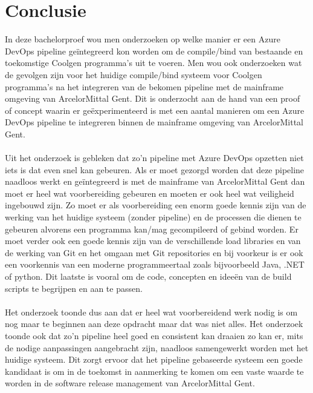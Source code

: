 
\chapter{Conclusie}%
\label{ch:conclusie}

In deze bachelorproef wou men onderzoeken op welke manier er een Azure DevOps pipeline geïntegreerd kon worden om de compile/bind van bestaande en toekomstige Coolgen programma's uit te voeren. Men wou ook onderzoeken wat de gevolgen zijn voor het huidige compile/bind systeem voor Coolgen programma's na het integreren van de bekomen pipeline met de mainframe omgeving van ArcelorMittal Gent. Dit is onderzocht aan de hand van een proof of concept waarin er geëxperimenteerd is met een aantal manieren om een Azure DevOps pipeline te integreren binnen de mainframe omgeving van ArcelorMittal Gent. 
\\ \\
Uit het onderzoek is gebleken dat zo'n pipeline met Azure DevOps opzetten niet iets is dat even snel kan gebeuren. Als er moet gezorgd worden dat deze pipeline naadloos werkt en geïntegreerd is met de mainframe van ArcelorMittal Gent dan moet er heel wat voorbereiding gebeuren en moeten er ook heel wat veiligheid ingebouwd zijn. Zo moet er als voorbereiding een enorm goede kennis zijn van de werking van het huidige systeem (zonder pipeline) en de processen die dienen te gebeuren alvorens een programma kan/mag gecompileerd of gebind worden. Er moet verder ook een goede kennis zijn van de verschillende load libraries en van de werking van Git en het omgaan met Git repositories en bij voorkeur is er ook een voorkennis van een moderne programmeertaal zoals bijvoorbeeld Java, .NET of python. Dit laatste is vooral om de code, concepten en ideeën van de build scripts te begrijpen en aan te passen. 
\\ \\
Het onderzoek toonde dus aan dat er heel wat voorbereidend werk nodig is om nog maar te beginnen aan deze opdracht maar dat was niet alles. Het onderzoek toonde ook dat zo'n pipeline heel goed en consistent kan draaien zo kan er, mits de nodige aanpassingen aangebracht zijn, naadloos samengewerkt worden met het huidige systeem. Dit zorgt ervoor dat het pipeline gebaseerde systeem een goede kandidaat is om in de toekomst in aanmerking te komen om een vaste waarde te worden in de software release management van ArcelorMittal Gent. 
